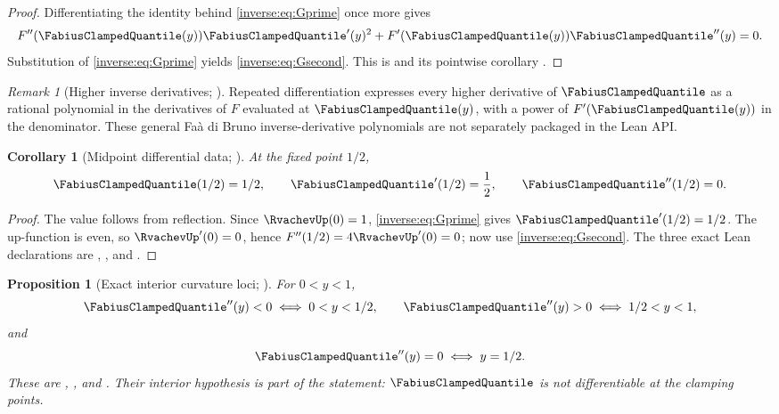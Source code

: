 \documentclass[11pt,oneside]{article}
\newtheorem{proposition}[proposition]{Proposition}
\newtheorem{corollary}[corollary]{Corollary}
\theoremstyle{definition}
\theoremstyle{remark}
\newtheorem{remark}[remark]{Remark}
\begin{document}
\begin{proof}
Differentiating the identity behind \eqref{inverse:eq:Gprime} once more gives
\[
 F''(\FabiusClampedQuantile(y))\FabiusClampedQuantile'(y)^2+
 F'(\FabiusClampedQuantile(y))\FabiusClampedQuantile''(y)=0.
\]
Substitution of \eqref{inverse:eq:Gprime} yields \eqref{inverse:eq:Gsecond}.  This is
 and its pointwise corollary
.
\end{proof}

\begin{remark}[Higher inverse derivatives; \Derived]
Repeated differentiation expresses every higher derivative of $\FabiusClampedQuantile$ as a
rational polynomial in the derivatives of $F$ evaluated at $\FabiusClampedQuantile(y)$, with a
power of $F'(\FabiusClampedQuantile(y))$ in the denominator.  These general Fa\`a di Bruno
inverse-derivative polynomials are not separately packaged in the Lean API.
\end{remark}

\begin{corollary}[Midpoint differential data; \Formalized]
\label{inverse:cor:midpoint-inverse}
At the fixed point $1/2$,
\[
 \FabiusClampedQuantile(1/2)=1/2,\qquad
 \FabiusClampedQuantile'(1/2)=\frac12,\qquad
 \FabiusClampedQuantile''(1/2)=0.
\]
\end{corollary}

\begin{proof}
The value follows from reflection.  Since $\RvachevUp(0)=1$,
\eqref{inverse:eq:Gprime} gives $\FabiusClampedQuantile'(1/2)=1/2$.  The up-function is even, so
$\RvachevUp'(0)=0$, hence $F''(1/2)=4\RvachevUp'(0)=0$; now use
\eqref{inverse:eq:Gsecond}.  The three exact Lean declarations are
, , and
.
\end{proof}

\begin{proposition}[Exact interior curvature loci; \Formalized]
For \(0<y<1\),
\[
 \FabiusClampedQuantile''(y)<0\iff0<y<1/2,\qquad
 \FabiusClampedQuantile''(y)>0\iff1/2<y<1,
\]
and
\[
 \FabiusClampedQuantile''(y)=0\iff y=1/2.
\]
These are ,
, and
.  Their interior hypothesis is
part of the statement: \(\FabiusClampedQuantile\) is not differentiable at the clamping points.
\end{proposition}
\end{document}

